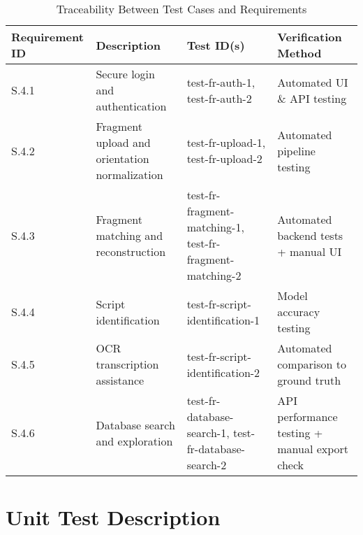 \documentclass[12pt, titlepage]{article}
\begin{document}
\begin{table}[ht]
\centering
\begin{tabular}{|p{3cm}|p{7cm}|p{3cm}|p{3cm}|}
\hline
\textbf{Requirement ID} & \textbf{Description} & \textbf{Test ID(s)} & \textbf{Verification Method} \\
\hline
S.4.1 & Secure login and authentication & test-fr-auth-1, test-fr-auth-2 & Automated UI \& API testing \\
\hline
S.4.2 & Fragment upload and orientation normalization & test-fr-upload-1, test-fr-upload-2 & Automated pipeline testing \\
\hline
S.4.3 & Fragment matching and reconstruction & test-fr-fragment-matching-1, test-fr-fragment-matching-2 & Automated backend tests + manual UI \\
\hline
S.4.4 & Script identification & test-fr-script-identification-1 & Model accuracy testing \\
\hline
S.4.5 & OCR transcription assistance & test-fr-script-identification-2 & Automated comparison to ground truth \\
\hline
S.4.6 & Database search and exploration & test-fr-database-search-1, test-fr-database-search-2 & API performance testing + manual export check \\
\hline
\end{tabular}
\caption{Traceability Between Test Cases and Requirements}
\end{table}

\section{Unit Test Description}



\end{document}
